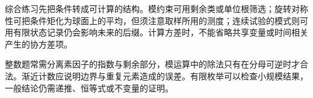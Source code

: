 综合练习先把条件转成可计算的结构。模约束可用剩余类或单位根筛选；旋转对称性可把条件矩化为球面上的平均，但须注意取样所用的测度；连续试验的模式则可用有限状态记录仍会影响未来的后缀。计算方差时，不能省略共享变量或时间相关产生的协方差项。

整数题常需分离素因子的指数与剩余部分，模运算中的除法只有在分母可逆时才合法。渐近计数应说明边界与重复元素造成的误差。有限枚举可以检查小规模结果，一般结论仍需递推、恒等式或不变量的证明。
\par\smallskip
